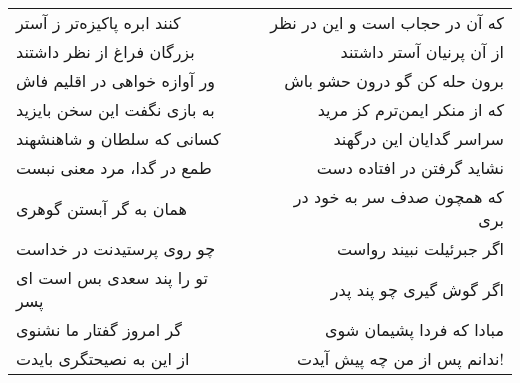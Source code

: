\begin{center}
\begin{longtable}{l p{0.5cm} r}
کنند ابره پاکیزه‌تر ز آستر
&&
که آن در حجاب است و این در نظر
\\
بزرگان فراغ از نظر داشتند
&&
از آن پرنیان آستر داشتند
\\
ور آوازه خواهی در اقلیم فاش
&&
برون حله کن گو درون حشو باش
\\
به بازی نگفت این سخن بایزید
&&
که از منکر ایمن‌ترم کز مرید
\\
کسانی که سلطان و شاهنشهند
&&
سراسر گدایان این درگهند
\\
طمع در گدا، مرد معنی نبست
&&
نشاید گرفتن در افتاده دست
\\
همان به گر آبستن گوهری
&&
که همچون صدف سر به خود در بری
\\
چو روی پرستیدنت در خداست
&&
اگر جبرئیلت نبیند رواست
\\
تو را پند سعدی بس است ای پسر
&&
اگر گوش گیری چو پند پدر
\\
گر امروز گفتار ما نشنوی
&&
مبادا که فردا پشیمان شوی
\\
از این به نصیحتگری بایدت
&&
ندانم پس از من چه پیش آیدت!
\\
\end{longtable}
\end{center}
